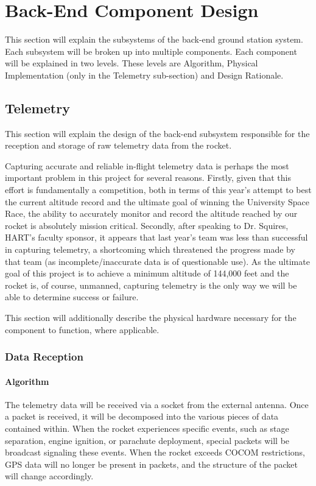 \documentclass[journal,10pt,onecolumn,compsoc]{IEEEtran}
\begin{document}

\section{Back-End Component Design}
	This section will explain the subsystems of the back-end ground station system.
	Each subsystem will be broken up into multiple components.
	Each component will be explained in two levels.
	These levels are Algorithm, Physical Implementation (only in the Telemetry sub-section) and Design Rationale.

	\subsection{Telemetry}
		\noindent This section will explain the design of the back-end subsystem responsible for the reception and storage of raw telemetry data from the rocket.
		
		\noindent Capturing accurate and reliable in-flight telemetry data is perhaps the most important problem in this project for several reasons. 
		Firstly, given that this effort is fundamentally a competition, both in terms of this year's attempt to best the current altitude record and the ultimate goal of winning the University Space Race, the ability to accurately monitor and record the altitude reached by our rocket is absolutely mission critical. 
		Secondly, after speaking to Dr. Squires, HART's faculty sponsor, it appears that last year's team was less than successful in capturing telemetry, a shortcoming which threatened the progress made by that team (as incomplete/inaccurate data is of questionable use). 
		As the ultimate goal of this project is to achieve a minimum altitude of 144,000 feet and the rocket is, of course, unmanned, capturing telemetry is the only way we will be able to determine success or failure.
		
		\noindent This section will additionally describe the physical hardware necessary for the component to function, where applicable.
		\setlength\parindent{0pt}
		\subsubsection{Data Reception}

			\paragraph{Algorithm}
				\noindent The telemetry data will be received via a socket from the external antenna.
				Once a packet is received, it will be decomposed into the various pieces of data contained within.
				When the rocket experiences specific events, such as stage separation, engine ignition, or parachute deployment, special packets will be broadcast signaling these events.
				When the rocket exceeds COCOM restrictions, GPS data will no longer be present in packets, and the structure of the packet will change accordingly.
\end{document}
